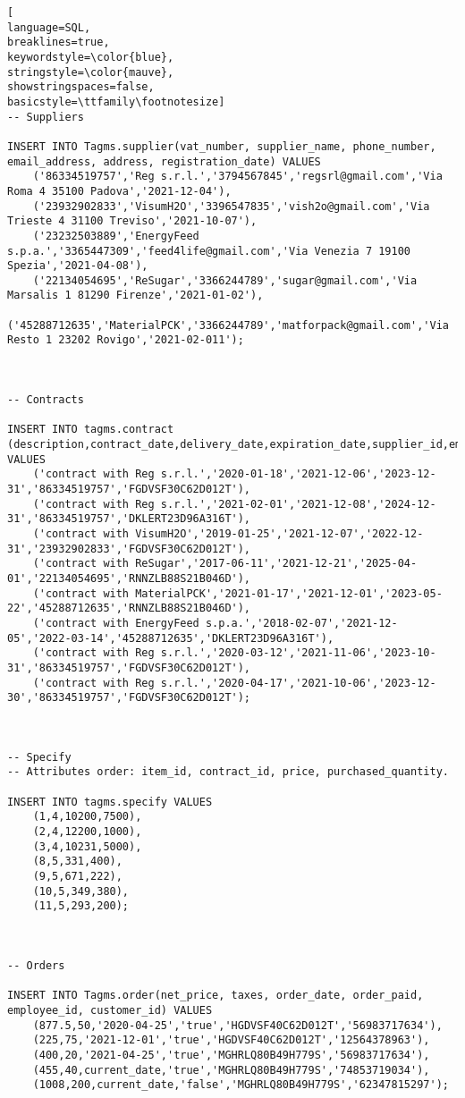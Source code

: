 \begin{lstlisting}[
language=SQL,
breaklines=true,
keywordstyle=\color{blue},
stringstyle=\color{mauve},
showstringspaces=false,
basicstyle=\ttfamily\footnotesize]
-- Suppliers

INSERT INTO Tagms.supplier(vat_number, supplier_name, phone_number, email_address, address, registration_date) VALUES
    ('86334519757','Reg s.r.l.','3794567845','regsrl@gmail.com','Via Roma 4 35100 Padova','2021-12-04'),
    ('23932902833','VisumH2O','3396547835','vish2o@gmail.com','Via Trieste 4 31100 Treviso','2021-10-07'),
    ('23232503889','EnergyFeed s.p.a.','3365447309','feed4life@gmail.com','Via Venezia 7 19100 Spezia','2021-04-08'),
    ('22134054695','ReSugar','3366244789','sugar@gmail.com','Via Marsalis 1 81290 Firenze','2021-01-02'),
    ('45288712635','MaterialPCK','3366244789','matforpack@gmail.com','Via Resto 1 23202 Rovigo','2021-02-011');



-- Contracts

INSERT INTO tagms.contract (description,contract_date,delivery_date,expiration_date,supplier_id,employee_id) VALUES
    ('contract with Reg s.r.l.','2020-01-18','2021-12-06','2023-12-31','86334519757','FGDVSF30C62D012T'),
    ('contract with Reg s.r.l.','2021-02-01','2021-12-08','2024-12-31','86334519757','DKLERT23D96A316T'),
    ('contract with VisumH2O','2019-01-25','2021-12-07','2022-12-31','23932902833','FGDVSF30C62D012T'),
    ('contract with ReSugar','2017-06-11','2021-12-21','2025-04-01','22134054695','RNNZLB88S21B046D'),
    ('contract with MaterialPCK','2021-01-17','2021-12-01','2023-05-22','45288712635','RNNZLB88S21B046D'),
    ('contract with EnergyFeed s.p.a.','2018-02-07','2021-12-05','2022-03-14','45288712635','DKLERT23D96A316T'),
    ('contract with Reg s.r.l.','2020-03-12','2021-11-06','2023-10-31','86334519757','FGDVSF30C62D012T'),
    ('contract with Reg s.r.l.','2020-04-17','2021-10-06','2023-12-30','86334519757','FGDVSF30C62D012T');



-- Specify
-- Attributes order: item_id, contract_id, price, purchased_quantity.

INSERT INTO tagms.specify VALUES
    (1,4,10200,7500),
    (2,4,12200,1000),
    (3,4,10231,5000),
    (8,5,331,400),
    (9,5,671,222),
    (10,5,349,380),
    (11,5,293,200);



-- Orders

INSERT INTO Tagms.order(net_price, taxes, order_date, order_paid, employee_id, customer_id) VALUES
    (877.5,50,'2020-04-25','true','HGDVSF40C62D012T','56983717634'),
    (225,75,'2021-12-01','true','HGDVSF40C62D012T','12564378963'),
    (400,20,'2021-04-25','true','MGHRLQ80B49H779S','56983717634'),
    (455,40,current_date,'true','MGHRLQ80B49H779S','74853719034'),
    (1008,200,current_date,'false','MGHRLQ80B49H779S','62347815297');




\end{lstlisting}
